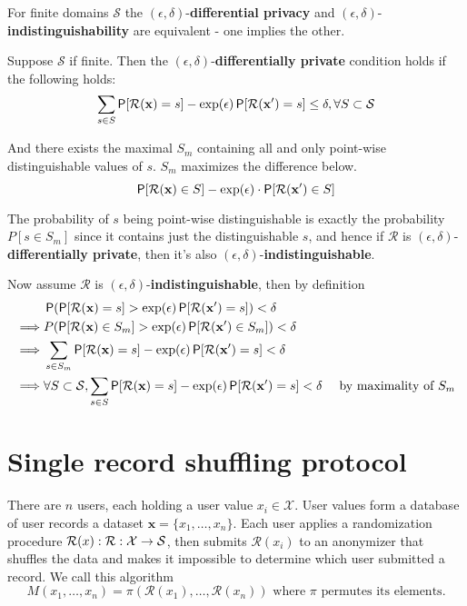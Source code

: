 \documentclass[11pt]{article}
\newcommand{\bbx}{\pmb{x}}
\newcommand{\cX}{\mathcal{X}}
\newcommand{\cR}{\mathcal{R}}
\newcommand{\Ssp}{\mathcal{S}}
\newcommand{\xv}{\mathbf{x}}
\begin{document}
\begin{prop} \label{prop:equavalent} For finite domains ${\Ssp}$ the $(\epsilon,\delta)$-\textbf{differential privacy} and  $(\epsilon,\delta)$-\textbf{indistinguishability} are equivalent - one implies the other. 

Suppose ${\Ssp}$  if finite.  Then the $(\epsilon,\delta)$-\textbf{differentially private} condition holds if the following holds:
\begin{align}\label{eq:diff}
\sum_{s \in S} \P[\cR(\xv) = s] -  \exp(\epsilon)  \P[\cR(\xv') = s] \le \delta , \forall S \cont \Ssp
\end{align}

And there exists the maximal $S_m$ containing all and only point-wise distinguishable values of $s$.  $S_m$ maximizes the difference below.
 \[ \P[\cR(\xv) \in S]  - \exp(\epsilon) \cdot \P[\cR(\xv') \in S] \]
 
The probability of $s$ being point-wise distinguishable is exactly the probability $P[s \in S_m]$ since it contains just the distinguishable $s$, and hence if  $\cR$ is $(\epsilon,\delta)$-\textbf{differentially private}, then it's also $(\epsilon,\delta)$-\textbf{indistinguishable}.

Now assume $\cR$ is $(\epsilon,\delta)$-\textbf{indistinguishable}, then by definition
\begin{align*}
& \P( \P[\cR(\xv) = s] >  \exp(\epsilon) \P[\cR(\xv') = s] ) < \delta & \\
\implies & P( \P[\cR(\xv) \in S_m] >  \exp(\epsilon) \P[\cR(\xv') \in S_m]) < \delta & \\
\implies & \sum_{s \in S_m} \P[\cR(\xv) = s] -  \exp(\epsilon)  \P[\cR(\xv') = s] < \delta & \\
\implies & \forall S \cont \Ssp,  \sum_{s \in S} \P[\cR(\xv) = s] -  \exp(\epsilon)  \P[\cR(\xv') = s] < \delta  & \text{ by maximality of } S_m
\end{align*}
\end{prop}

\section{Single record shuffling protocol}

There are $n$ users, each holding a user value $x_i \in \cX$.  User values form a database of user records a dataset $\bbx = \{x_1,\dots ,x_n\}$. Each user applies a randomization procedure $\cR(x): \map{\cR}{\cX}{\Ssp}$, then submits $\cR(x_i)$ to an anonymizer that shuffles the data and makes it impossible to determine which user submitted a record. We call this algorithm 
\[
M(x_1,  \dots , x_n) = \pi (\cR(x_1), \dots , \cR(x_n)) \text{ where } \pi \text{ permutes its elements}. 
\]
\end{document}
